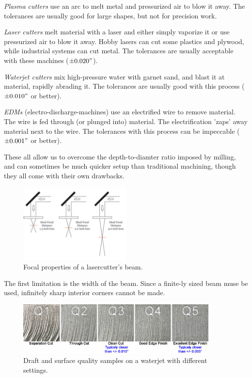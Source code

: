\documentclass[10pt,letterpaper]{book}
\begin{document}
 \begin{asparaenum}[a)]
  	\item \textit{Plasma cutters} use an arc to melt metal and pressurized air to blow it away. The tolerances are usually good for large shapes, but not for precision work.
 	\item \textit{Laser cutters} melt material with a laser and either simply vaporize it or use pressurized air to blow it away. Hobby lasers can cut some plastics and plywood, while industrial systems can cut metal. The tolerances are usually acceptable with these machines ($\pm 0.020"$).
 	\item \textit{Waterjet cutters} mix high-pressure water with garnet sand, and blast it at material, rapidly abrading it. The tolerances are usually good with this process ($\pm 0.010"$ or better).
 	\item \textit{EDMs} (electro-discharge-machines) use an electrified wire to remove material. The wire is fed through (or plunged into) material. The electrification 'zaps' away material next to the wire. The tolerances with this process can be impeccable ($\pm 0.001"$ or better). 
\end{asparaenum}
 	
 	These all allow us to overcome the depth-to-diamter ratio imposed by milling, and can sometimes be much quicker setup than traditional machining, though they all come with their own drawbacks.
 
 \begin{figure}[H] \centering
 	\includegraphics[width=0.5\textwidth]{imgs/lasercut_focus.jpeg}
 	\caption{Focal properties of a lasercutter's beam.}
 \end{figure}
 
  The first limitation is the width of the beam. Since a finite-ly sized beam muse be used, infinitely sharp interior corners cannot be made.
 
 \begin{figure}[H] \centering
 	\includegraphics[width=0.9\textwidth]{imgs/waterjet_draft.jpeg}
 	\caption{Draft and surface quality samples on a waterjet with different settings.}
 \end{figure}
 
\end{document}
